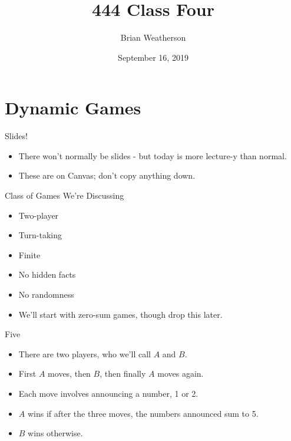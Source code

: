 \documentclass[ignorenonframetext,]{beamer}
\title{444 Class Four}
\author{Brian Weatherson}
\date{September 16, 2019}
\providecommand{\tightlist}{%
  \setlength{\itemsep}{0pt}\setlength{\parskip}{0pt}}
\renewcommand{\,}{\text{, }}
\begin{document}
\frame{\titlepage}

\hypertarget{dynamic-games}{%
\section{Dynamic Games}\label{dynamic-games}}

\begin{frame}{Slides!}
\protect\hypertarget{slides}{}

\begin{itemize}
\tightlist
\item
  There won't normally be slides - but today is more lecture-y than
  normal.
\item
  These are on Canvas; don't copy anything down.
\end{itemize}

\end{frame}

\begin{frame}{Class of Games We're Discussing}
\protect\hypertarget{class-of-games-were-discussing}{}

\begin{itemize}[<+->]
\tightlist
\item
  Two-player
\item
  Turn-taking
\item
  Finite
\item
  No hidden facts
\item
  No randomness
\item
  We'll start with zero-sum games, though drop this later.
\end{itemize}

\end{frame}

\begin{frame}{Five}
\protect\hypertarget{five}{}

\begin{itemize}
\tightlist
\item
  There are two players, who we'll call \(A\) and \(B\).
\item
  First \(A\) moves, then \(B\), then finally \(A\) moves again.
\item
  Each move involves announcing a number, 1 or 2.
\item
  \(A\) wins if after the three moves, the numbers announced sum to 5.
\item
  \(B\) wins otherwise.
\end{itemize}

\end{frame}
\end{document}
